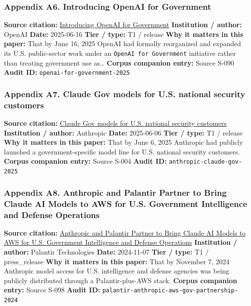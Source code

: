 \documentclass[
  american,
  11pt,
  letterpaper,
]{article}
\begin{document}
\subsubsection{Appendix A6. Introducing OpenAI for
Government}\label{appendix-a6-introducing-openai-for-government}

\textbf{Source citation:}
\href{https://openai.com/global-affairs/introducing-openai-for-government/}{Introducing
OpenAI for Government} \textbf{Institution / author:} OpenAI
\textbf{Date:} 2025-06-16 \textbf{Tier / type:} T1 / release \textbf{Why
it matters in this paper:} That by June 16, 2025 OpenAI had formally
reorganized and expanded its U.S. public-sector work under an
\texttt{OpenAI\ for\ Government} initiative rather than treating
government use as\ldots{} \textbf{Corpus companion entry:} Source S-090
\textbf{Audit ID:} \texttt{openai-for-government-2025}

\subsubsection{Appendix A7. Claude Gov models for U.S. national security
customers}\label{appendix-a7-claude-gov-models-for-u-s-national-security-customers}

\textbf{Source citation:}
\href{https://www.anthropic.com/news/claude-gov-models-for-u-s-national-security-customers}{Claude
Gov models for U.S. national security customers} \textbf{Institution /
author:} Anthropic \textbf{Date:} 2025-06-06 \textbf{Tier / type:} T1 /
release \textbf{Why it matters in this paper:} That by June 6, 2025
Anthropic had publicly launched a government-specific model line for
U.S. national security customers. \textbf{Corpus companion entry:}
Source S-004 \textbf{Audit ID:} \texttt{anthropic-claude-gov-2025}

\subsubsection{Appendix A8. Anthropic and Palantir Partner to Bring
Claude AI Models to AWS for U.S. Government Intelligence and Defense
Operations}\label{appendix-a8-anthropic-and-palantir-partner-to-bring-claude-ai-models-to-aws-for-u-s-government-intelligence-and-defense-operations}

\textbf{Source citation:}
\href{https://investors.palantir.com/news-details/2024/Anthropic-and-Palantir-Partner-to-Bring-Claude-AI-Models-to-AWS-for-U.S.-Government-Intelligence-and-Defense-Operations/}{Anthropic
and Palantir Partner to Bring Claude AI Models to AWS for U.S.
Government Intelligence and Defense Operations} \textbf{Institution /
author:} Palantir Technologies \textbf{Date:} 2024-11-07 \textbf{Tier /
type:} T1 / press\_release \textbf{Why it matters in this paper:} That
by November 7, 2024 Anthropic model access for U.S. intelligence and
defense agencies was being publicly distributed through a
Palantir-plus-AWS stack. \textbf{Corpus companion entry:} Source S-098
\textbf{Audit ID:} \texttt{palantir-anthropic-aws-gov-partnership-2024}
\end{document}
